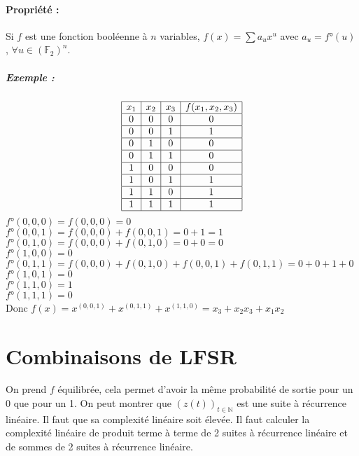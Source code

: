 \documentclass[12pt,a4paper]{report}
\begin{document}
\paragraph{Propriété :\\}
Si $f$ est une fonction booléenne à $n$ variables, $f(x) = \sum a_ux^u $ avec $a_u = f°(u)$, $\forall u \in (\mathbb{F}_2)^n$.
\subparagraph{Exemple :\\}
$$ \begin{array}{|c|c|c|c|}\hline
x_1 & x_2 & x_3 & f(x_1,x_2,x_3) \\\hline
0 & 0 & 0 & 0 \\\hline
0 & 0 & 1 & 1 \\\hline
0 & 1 & 0 & 0 \\\hline
0 & 1 & 1 & 0 \\\hline
1 & 0 & 0 & 0 \\\hline
1 & 0 & 1 & 1 \\\hline
1 & 1 & 0 & 1 \\\hline
1 & 1 & 1 & 1 \\\hline
\end{array} $$
$f°(0,0,0) = f(0,0,0) = 0$\\
$f°(0,0,1) = f(0,0,0) + f(0,0,1) = 0 + 1 = 1$\\
$f°(0,1,0) = f(0,0,0) + f(0,1,0) = 0 + 0 = 0$\\
$f°(1,0,0) = 0$\\
$f°(0,1,1) = f(0,0,0) + f(0,1,0) + f(0,0,1) + f(0,1,1) = 0 + 0 + 1 + 0$\\
$f°(1,0,1) = 0$\\
$f°(1,1,0) = 1$\\
$f°(1,1,1) = 0$\\
Donc $f(x) = x^{(0,0,1)} + x^{(0,1,1)} + x^{(1,1,0)} = x_3+x_2x_3+x_1x_2$
\section{Combinaisons de LFSR}
\begin{figure}[h!]
	\centering
  \scalebox{0.6}{}	
\end{figure}
On prend $f$ équilibrée, cela permet d'avoir la même probabilité de sortie pour un 0 que pour un 1. On peut montrer que $(z(t))_{t \in \mathbb{N}}$ est une suite à récurrence linéaire. Il faut que sa complexité linéaire soit élevée. Il faut calculer la complexité linéaire de produit terme à terme de 2 suites à récurrence linéaire et de sommes de 2 suites à récurrence linéaire.\\
\end{document}
